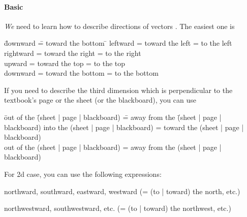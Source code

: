 \documentclass[11pt,pdfa,lastpage]{MishoNote}
\newcommand\fakebullet{\makebox[2.5em][r]{\textbullet\kern.5em}}
\begin{document}
\paragraph{Basic}
\emph{We} need to learn how to describe directions of vectors . The easiest one is
\begin{tabbing}
 \fakebullet \= downward   \== toward the bottom      \=\kill
 \fakebullet \> leftward   \>= toward the left        \>= to the left\\[\itemsep]
 \fakebullet \> rightward  \>= toward the right       \>= to the right\\[\itemsep]
 \fakebullet \> upward     \>= toward the top         \>= to the top\\[\itemsep]
 \fakebullet \> downward   \>= toward the bottom      \>= to the bottom
\end{tabbing}
If you need to describe the third dimension which is perpendicular to the textbook's page or the sheet (or the blackboard), you can use
\begin{tabbing}
  \fakebullet \= out of the \= (sheet | page | blackboard) \= = away from the \= (sheet | page | blackboard)\kill
  \fakebullet \> into   the \> (sheet | page | blackboard) \> = toward    the \> (sheet | page | blackboard)\\[\itemsep]
  \fakebullet \> out of the \> (sheet | page | blackboard) \> = away from the \> (sheet | page | blackboard)
\end{tabbing}
For 2d case,  you can use the following expressions:
\begin{miniitemize}
 \item northward, southward, eastward, westward (= (to | toward) the north, etc.)
 \item northwestward, southwestward, etc. (= (to | toward) the northwest, etc.)
\end{miniitemize}
\end{document}
